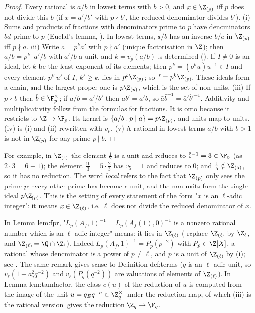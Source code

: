 \begin{proof}
Every rational is $a/b$ in lowest terms with $b>0$, and $x\in\Z_{(p)}$ iff $p$ does not divide this $b$ (if $x=a'/b'$ with $p\nmid b'$, the
reduced denominator divides $b'$). (i) Sums and products of fractions with denominators prime to $p$ have denominators
$bd$ prime to $p$ (Euclid's lemma, ). In lowest terms, $a/b$ has an inverse $b/a$ in $\Z_{(p)}$ iff $p\nmid a$.
(ii) Write $a=p^ka'$ with $p\nmid a'$ (unique factorisation in $\Z$); then $a/b=p^k\cdot a'/b$ with $a'/b$ a unit, and $k=v_p(a/b)$ is
determined (). If $I\ne0$ is an ideal, let $k$ be the least exponent of its elements; then $p^k=(p^ku)u^{-1}\in I$
and every element $p^{k'}u'$ of $I$, $k'\ge k$, lies in $p^k\Z_{(p)}$; so $I=p^k\Z_{(p)}$. These ideals form a chain, and the largest proper one
is $p\Z_{(p)}$, which is the set of non-units.
(iii) If $p\nmid b$ then $\bar b\in\F_p^\times$; if $a/b=a'/b'$ then $ab'=a'b$, so $\bar a\bar b^{-1}=\bar a'\bar b'^{-1}$. Additivity and
multiplicativity follow from the formulas for fractions. It is onto because it restricts to $\Z\to\F_p$. Its kernel is
$\{a/b:p\mid a\}=p\Z_{(p)}$, and units map to units.
(iv) is (i) and (ii) rewritten with $v_p$. (v) A rational in lowest terms $a/b$ with $b>1$ is not in $\Z_{(p)}$ for any prime $p\mid b$.
\end{proof}

For example, in $\Z_{(5)}$ the element $\frac12$ is a unit and reduces to $\bar2^{-1}=3\in\F_5$ (as $2\cdot3=6\equiv1$); the element $\frac{10}3=5\cdot\frac23$ has $v_5=1$ and
reduces to $0$; and $\frac15\notin\Z_{(5)}$, so it has no reduction. The word \emph{local} refers to the fact that $\Z_{(p)}$ only sees the prime $p$:
every other prime has become a unit, and the non-units form the single ideal $p\Z_{(p)}$. This is the setting of every statement of the form
"$x$ is an $\ell$-adic integer": it means $x\in\Z_{(\ell)}$, i.e. $\ell$ does not divide the reduced denominator of $x$.

\begin{paperlink}\label{pl:rings:fpr}
In Lemma lem:fpr, "$L_p(A_f,1)^{-1}=L_p(A_f(1),0)^{-1}$ is a nonzero rational number which is an $\ell$-adic integer" means: it lies in
$\Z_{(\ell)}$ ( replace $\Z_{(\ell)}$ by $\Z_\ell$, and $\Z_{(\ell)}=\Q\cap\Z_\ell$). Indeed $L_p(A_f,1)^{-1}=P_p(p^{-2})$ with $P_p\in\Z[X]$,
a rational whose denominator is a power of $p\ne\ell$, and $p$ is a unit of $\Z_{(\ell)}$ by (i); see
. The same remark gives sense to Definition def:terms ($q$ is an $\ell$-adic unit, so
$v_\ell(1-a_q^2q^{-2})$ and $v_\ell(P_q(q^{-2}))$ are valuations of elements of $\Z_{(\ell)}$). In Lemma lem:tamfactor, the class $c(u)$ of the
reduction of $u$ is computed from the image of the unit $u=q_Eq^{-n}\in\Z_q^\times$ under the reduction map, of which
(iii) is the rational version;  gives the reduction $\Z_q\to\F_q$.
\end{paperlink}


